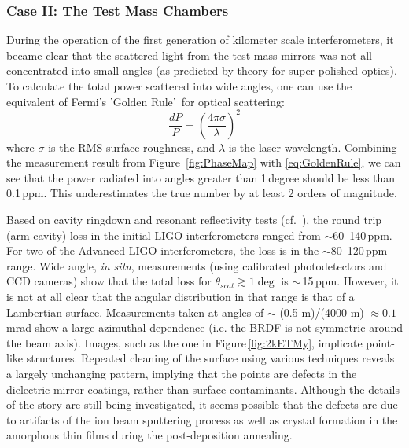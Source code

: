 \subsubsection{Case II: The Test Mass Chambers}
During the operation of the first generation of kilometer scale interferometers,
it became clear that the scattered light from the test mass mirrors was not
all concentrated into small angles (as predicted by theory for super-polished
optics). To calculate the total power scattered into wide angles, one can use the
equivalent of Fermi's 'Golden Rule'\,\cite{Weiss:Scatter97} for optical scattering:
\begin{equation}
\frac{dP}{P} = \left( \frac{4 \pi \sigma}{\lambda} \right)^2
\label{eq:GoldenRule}
\end{equation}
where $\sigma$ is the RMS surface roughness, and $\lambda$ is the
laser wavelength. Combining the measurement result from
Figure~\ref{fig:PhaseMap} with \eqref{eq:GoldenRule}, we can see that the power radiated into
angles greater than 1\,degree should be
less than 0.1\,ppm. This underestimates the true number by
at least 2 orders of magnitude.

Based on cavity ringdown and resonant reflectivity tests (cf.~\cite{Isogai2013}),
the round trip (arm cavity) loss in the initial LIGO interferometers ranged from
$\sim$60--140\,ppm. For two of the Advanced LIGO interferometers, the loss
is in the $\sim$80--120\,ppm range. Wide angle, \textit{in situ},
measurements (using calibrated photodetectors and CCD cameras) show
that the total loss for $\theta_{scat} \gtrsim 1\deg$ is $\sim$\,15\,ppm.
However, it is not at all clear that the angular distribution in that
range is that of a Lambertian surface. Measurements taken at angles of
$\sim$ (0.5 m)/(4000 m) $\approx 0.1$\,mrad show a large azimuthal dependence
(i.e. the BRDF is not symmetric around the beam axis).
Images, such as the one in Figure\,\ref{fig:2kETMy}, 
implicate point-like structures.
Repeated cleaning of the surface using various techniques reveals a largely
unchanging pattern, implying that the points are defects in the dielectric
mirror coatings, rather than surface contaminants. Although the details of the
story are still being investigated, it seems possible that the defects
are due to artifacts of the ion beam sputtering process as well as
crystal formation in the amorphous thin films during the
post-deposition annealing.

